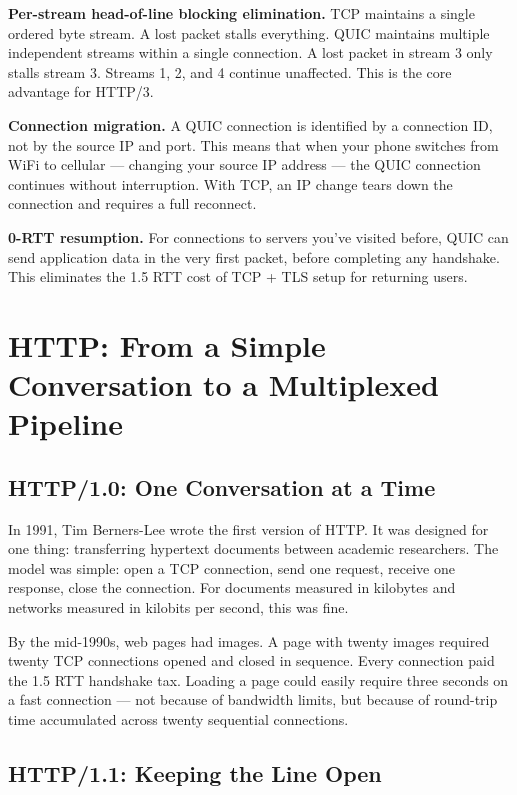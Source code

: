\documentclass[11pt,a4paper]{article}
\begin{document}
\textbf{Per-stream head-of-line blocking elimination.} TCP maintains a single ordered byte stream. A lost packet stalls everything. QUIC maintains multiple independent streams within a single connection. A lost packet in stream 3 only stalls stream 3. Streams 1, 2, and 4 continue unaffected. This is the core advantage for HTTP/3.

\textbf{Connection migration.} A QUIC connection is identified by a connection ID, not by the source IP and port. This means that when your phone switches from WiFi to cellular --- changing your source IP address --- the QUIC connection continues without interruption. With TCP, an IP change tears down the connection and requires a full reconnect.

\textbf{0-RTT resumption.} For connections to servers you've visited before, QUIC can send application data in the very first packet, before completing any handshake. This eliminates the 1.5 RTT cost of TCP + TLS setup for returning users.

\section{HTTP: From a Simple Conversation to a Multiplexed Pipeline}

\subsection{HTTP/1.0: One Conversation at a Time}

In 1991, Tim Berners-Lee wrote the first version of HTTP. It was designed for one thing: transferring hypertext documents between academic researchers. The model was simple: open a TCP connection, send one request, receive one response, close the connection. For documents measured in kilobytes and networks measured in kilobits per second, this was fine.

By the mid-1990s, web pages had images. A page with twenty images required twenty TCP connections opened and closed in sequence. Every connection paid the 1.5 RTT handshake tax. Loading a page could easily require three seconds on a fast connection --- not because of bandwidth limits, but because of round-trip time accumulated across twenty sequential connections.

\subsection{HTTP/1.1: Keeping the Line Open}
\end{document}

